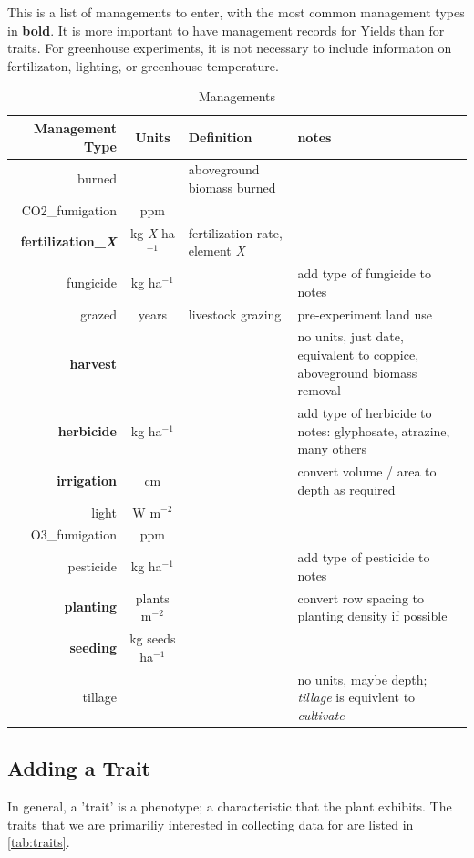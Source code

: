 \documentclass[12pt,english,portrait]{article}
\begin{document}
\begin{table}[hb]
  \caption{Managements}{This is a list of  managements to enter, with the most common management types in \textbf{bold}. It is more important to have management records for Yields than for traits. For greenhouse experiments, it is not necessary to include informaton on fertilizaton, lighting, or greenhouse temperature.}
  \label{tab:mgmttype}
  \begin{tabularx}{\linewidth}{rcp{1.5in}p{1.5in}}
    \hline
    \textbf{Management Type} & Units & Definition & notes\\ \hline
    burned & & aboveground biomass burned & \\
    CO2\_fumigation&ppm & & \\
    \textbf{fertilization\_\textit{X}} & kg \textit{X} ha$^{-1}$ & fertilization rate, element \textit{X} &  \\
    fungicide & kg ha$^{-1}$ & &add type of fungicide to notes \\
    grazed& years & livestock grazing &pre-experiment land use\\
    \textbf{harvest} & & & no units, just date, equivalent to coppice, aboveground biomass removal \\
    \textbf{herbicide} & kg ha$^{-1}$ & &add type of herbicide to notes: glyphosate, atrazine, many others \\
    \textbf{irrigation} &cm & & convert volume / area to depth as required\\
    light &W m$^{-2}$ & & \\ 
    O3\_fumigation&ppm & & \\
    pesticide & kg ha$^{-1}$ & &add type of pesticide to notes \\
    \textbf{planting}  & plants m$^{-2}$ & &convert row spacing to planting density if possible \\
    \textbf{seeding}   & kg seeds ha$^{-1}$ & &\\
    tillage & & &no units, maybe depth; \emph{tillage} is equivlent to \emph{cultivate}\\
    \hline
  \end{tabularx}
\end{table}


\subsection{Adding a Trait}\label{sec:traits}

 In general, a 'trait' is a phenotype; a characteristic that the plant exhibits.
 The traits that we are primariliy interested in collecting data for are listed in \autoref{tab:traits}. 
\end{document}
